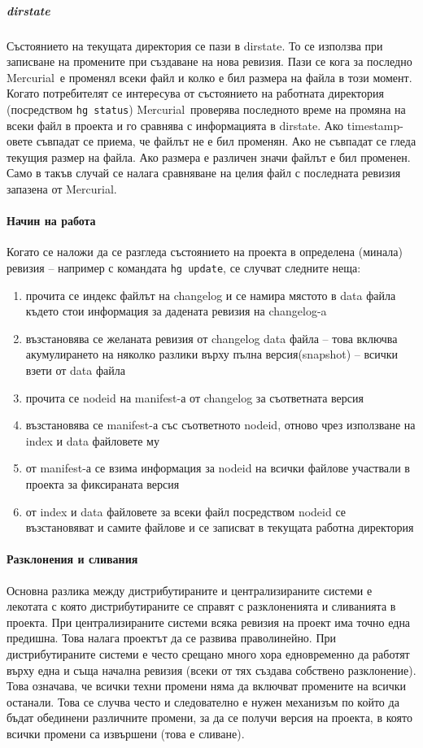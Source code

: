 \documentclass[a4paper]{article}
\def\Hg{Mercurial}
\begin{document}
    \subparagraph{dirstate} Състоянието на текущата директория се пази
    в dirstate. То се използва при записване на промените при създаване на нова
    ревизия. Пази се кога за последно \Hg\ е променял всеки файл и колко е бил
    размера на файла в този момент. Когато потребителят се интересува от
    състоянието на работната директория (посредством \texttt{hg status}) \Hg\
    проверява последното време на промяна на всеки файл в проекта и го сравнява
    с информацията в dirstate.  Ако timestamp-овете съвпадат се приема, че
    файлът не е бил променян. Ако не съвпадат се гледа текущия размер на файла.
    Ако размера е различен значи файлът е бил променен. Само в такъв случай се
    налага сравняване на целия файл с последната ревизия запазена от \Hg.

    \paragraph{Начин на работа}
    Когато се наложи да се разгледа състоянието на проекта в определена
    (минала) ревизия -- например с командата \texttt{hg update}, се
    случват следните неща:
    \begin{enumerate}
      \item прочита се индекс файлът на changelog и се намира мястото в data
      файла където стои информация за дадената ревизия на changelog-a
      \item възстановява се желаната ревизия от changelog data файла -- това
      включва акумулирането на няколко разлики върху пълна
      версия(snapshot) -- всички взети от data файла
      \item прочита се nodeid на manifest-а от changelog за съответната версия
      \item възстановява се manifest-а със съответното nodeid, отново чрез
      използване на index и data файловете му
      \item от manifest-а се взима информация за nodeid на всички файлове
      участвали в проекта за фиксираната версия
      \item от index и data файловете за всеки файл посредством nodeid се
      възстановяват и самите файлове и се записват в текущата работна
      директория
    \end{enumerate}

    \paragraph{Разклонения и сливания}
    Основна разлика между дистрибутираните и централизираните системи
    е лекотата с която дистрибутираните се справят с разклоненията и сливанията
    в проекта. При централизираните системи всяка ревизия на проект има точно
    една предишна. Това налага проектът да се развива праволинейно. При
    дистрибутираните системи е често срещано много хора едновременно да работят
    върху една и съща начална ревизия (всеки от тях създава собствено
    разклонение). Това означава, че всички техни промени няма да включват
    промените на всички останали. Това се случва често и следователно е нужен
    механизъм по който да бъдат обединени различните промени, за да се получи
    версия на проекта, в която всички промени са извършени (това е сливане).
\end{document}

